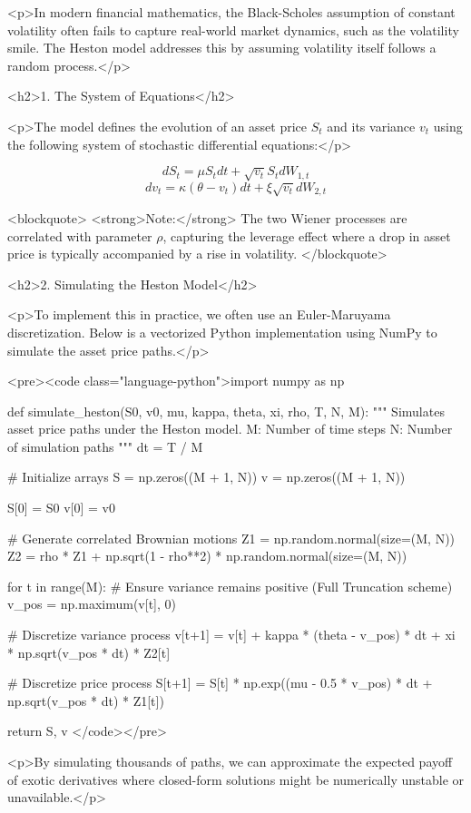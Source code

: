 <p>In modern financial mathematics, the Black-Scholes assumption of constant volatility often fails to capture real-world market dynamics, such as the volatility smile. The Heston model addresses this by assuming volatility itself follows a random process.</p>

<h2>1. The System of Equations</h2>

<p>The model defines the evolution of an asset price $S_t$ and its variance $v_t$ using the following system of stochastic differential equations:</p>

$$ dS_t = \mu S_t dt + \sqrt{v_t} S_t dW_{1,t} $$
$$ dv_t = \kappa(\theta - v_t)dt + \xi \sqrt{v_t} dW_{2,t} $$

<blockquote>
  <strong>Note:</strong> The two Wiener processes are correlated with parameter $\rho$, capturing the leverage effect where a drop in asset price is typically accompanied by a rise in volatility.
</blockquote>

<h2>2. Simulating the Heston Model</h2>

<p>To implement this in practice, we often use an Euler-Maruyama discretization. Below is a vectorized Python implementation using NumPy to simulate the asset price paths.</p>

<pre><code class="language-python">import numpy as np

def simulate_heston(S0, v0, mu, kappa, theta, xi, rho, T, N, M):
    """
    Simulates asset price paths under the Heston model.
    M: Number of time steps
    N: Number of simulation paths
    """
    dt = T / M
    
    # Initialize arrays
    S = np.zeros((M + 1, N))
    v = np.zeros((M + 1, N))
    
    S[0] = S0
    v[0] = v0
    
    # Generate correlated Brownian motions
    Z1 = np.random.normal(size=(M, N))
    Z2 = rho * Z1 + np.sqrt(1 - rho**2) * np.random.normal(size=(M, N))
    
    for t in range(M):
        # Ensure variance remains positive (Full Truncation scheme)
        v_pos = np.maximum(v[t], 0)
        
        # Discretize variance process
        v[t+1] = v[t] + kappa * (theta - v_pos) * dt + xi * np.sqrt(v_pos * dt) * Z2[t]
        
        # Discretize price process
        S[t+1] = S[t] * np.exp((mu - 0.5 * v_pos) * dt + np.sqrt(v_pos * dt) * Z1[t])
        
    return S, v
</code></pre>

<p>By simulating thousands of paths, we can approximate the expected payoff of exotic derivatives where closed-form solutions might be numerically unstable or unavailable.</p>